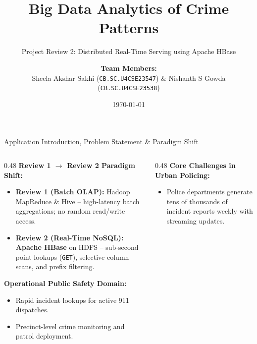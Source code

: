 \documentclass[aspectratio=169]{beamer}
\title{Big Data Analytics of Crime Patterns}
\subtitle{Project Review 2: Distributed Real-Time Serving using Apache HBase}
\author{\textbf{Team Members:}\\[0.15cm] Sheela Akshar Sakhi (\texttt{CB.SC.U4CSE23547}) \quad \& \quad Nishanth S Gowda (\texttt{CB.SC.U4CSE23538})}
\institute{Department of Computer Science and Engineering\\Amrita Vishwa Vidyapeetham}
\date{\today}
\begin{document}
\begin{frame}[plain]
    \titlepage
\end{frame}

\begin{frame}{Application Introduction, Problem Statement \& Paradigm Shift}
    \begin{columns}[T]
        \begin{column}{0.48\textwidth}
            \textbf{\textcolor{NavyBlue}{Review 1 $\to$ Review 2 Paradigm Shift:}}
            \vspace{0.05cm}
            \begin{itemize}\footnotesize
                \setlength{\itemsep}{2pt}
                \item \textbf{Review 1 (Batch OLAP):} Hadoop MapReduce \& Hive -- high-latency batch aggregations; no random read/write access.
                \item \textbf{Review 2 (Real-Time NoSQL):} \textbf{Apache HBase} on HDFS -- sub-second point lookups (\texttt{GET}), selective column scans, and prefix filtering.
            \end{itemize}
            \vspace{0.08cm}
            \textbf{\textcolor{NavyBlue}{Operational Public Safety Domain:}}
            \begin{itemize}\footnotesize
                \setlength{\itemsep}{1pt}
                \item Rapid incident lookups for active 911 dispatches.
                \item Precinct-level crime monitoring and patrol deployment.
            \end{itemize}
        \end{column}
        \begin{column}{0.48\textwidth}
            \textbf{\textcolor{AmritaMaroon}{Core Challenges in Urban Policing:}}
            \vspace{0.05cm}
            \begin{itemize}\footnotesize
                \setlength{\itemsep}{1pt}
                \item Police departments generate tens of thousands of incident reports weekly with streaming updates.

\end{itemize}
\end{column}
\end{columns}
\end{frame}
\end{document}
